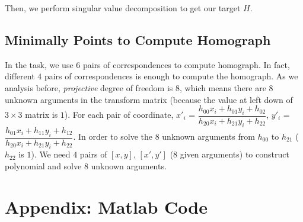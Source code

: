 \documentclass[12pt]{article}
\begin{document}
Then, we perform singular value decomposition to get our target $H$.

\subsection{Minimally Points to Compute Homograph}

In the task, we use $6$ pairs of correspondences to compute homograph. In fact, different $4$ pairs of correspondences is enough to compute the homograph. As we analysis before, \textit{projective} degree of freedom is $8$, which means there are $8$ unknown arguments in the transform matrix (because the value at left down of $3 \times 3$ matrix is $1$). For each pair of coordinate, $x'_{i}$ = $\dfrac{h_{00}x_{i}+h_{01}y_{i}+h_{02}}{h_{20}x_{i}+h_{21}y_{i}+h_{22}}$, $y'_{i}$ = $\dfrac{h_{01}x_{i}+h_{11}y_{i}+h_{12}}{h_{20}x_{i}+h_{21}y_{i}+h_{22}}$. In order to solve the $8$ unknown arguments from $h_{00}$ to $h_{21}$ ($h_{22}$ is $1$). We need $4$ pairs of $[x, y]$, $[x',y']$ ($8$ given arguments) to construct polynomial and solve $8$ unknown arguments. 

\section{Appendix: Matlab Code} 
\label{App:AppendixA}






\end{document}

